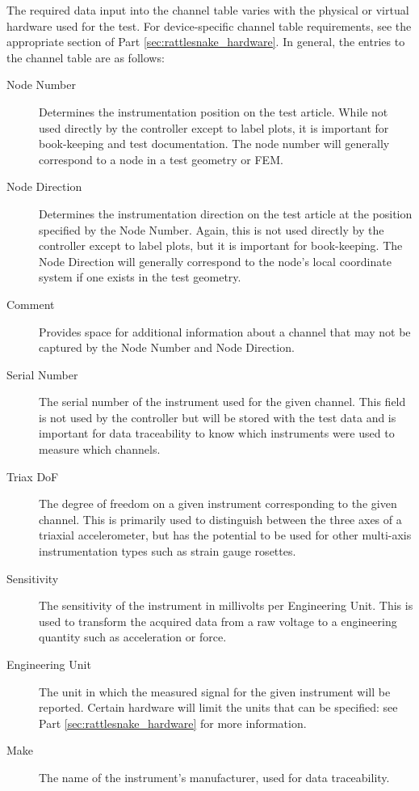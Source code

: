 \documentclass[pdf,12pt,report]{SANDreport}
\begin{document}
    The required data input into the channel table varies with the physical or virtual hardware used for the test.  For device-specific channel table requirements, see the appropriate section of Part \ref{sec:rattlesnake_hardware}.  In general, the entries to the channel table are as follows:
    \begin{description}
        \item[Node Number] Determines the instrumentation position on the test article.  While not used directly by the controller except to label plots, it is important for book-keeping and test documentation.  The node number will generally correspond to a node in a test geometry or \ac{FEM}.
        \item[Node Direction] Determines the instrumentation direction on the test article at the position specified by the Node Number.  Again, this is not used directly by the controller except to label plots, but it is important for book-keeping.  The Node Direction will generally correspond to the node's local coordinate system if one exists in the test geometry.
        \item[Comment] Provides space for additional information about a channel that may not be captured by the Node Number and Node Direction.
        \item[Serial Number] The serial number of the instrument used for the given channel.  This field is not used by the controller but will be stored with the test data and is important for data traceability to know which instruments were used to measure which channels.
        \item[Triax DoF] The degree of freedom on a given instrument corresponding to the given channel.  This is primarily used to distinguish between the three axes of a triaxial accelerometer, but has the potential to be used for other multi-axis instrumentation types such as strain gauge rosettes.
        \item[Sensitivity] The sensitivity of the instrument in millivolts per Engineering Unit.  This is used to transform the acquired data from a raw voltage to a engineering quantity such as acceleration or force.
        \item[Engineering Unit] The unit in which the measured signal for the given instrument will be reported.  Certain hardware will limit the units that can be specified: see Part \ref{sec:rattlesnake_hardware} for more information.
        \item[Make] The name of the instrument's manufacturer, used for data traceability.

\end{description}
\end{document}
